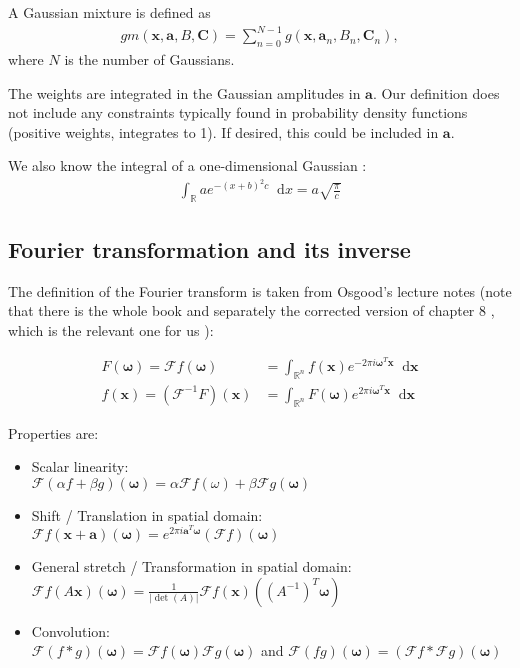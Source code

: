 \documentclass{paper}
\newcommand{\abs}[1]{\left| #1 \right|}
\newcommand{\F}{\ensuremath{\mathcal{F}}}
\newcommand{\vr}[1]{\ensuremath{\boldsymbol{#1}}}
\newcommand{\tr}[1]{\ensuremath{\boldsymbol{#1}}}
\newcommand{\f}[1]{#1}
\newcommand*\diff{\mathop{}\!\mathrm{d}}
\newcommand{\omegavec}[0]{\ensuremath{\vr{\omega{}}}}
\newcommand{\avec}[0]{\ensuremath{\vr{a}}}
\newcommand{\xvec}[0]{\ensuremath{\vr{x}}}
\begin{document}
A Gaussian mixture is defined as
\begin{align}
	\f{gm}(\vr{x}, \vr{a}, B, \tr{C}) = \sum_{n=0}^{N-1} g(\vr{x}, \vr{a}_n, B_{n}, \tr{C}_{n}),
\end{align}
where $N$ is the number of Gaussians.

The weights are integrated in the Gaussian amplitudes in $\vr{a}$.
Our definition does not include any constraints typically found in probability density functions (positive weights, integrates to 1).
If desired, this could be included in $\vr{a}$.

We also know the integral of a one-dimensional Gaussian \citep{wiki_gaussian_int}:
\begin{align}
	\label{eq:gaussian_integral}
	\int_{\mathbb{R}} a e^{-(x+b)^2 c} \diff x = a\sqrt{\frac{\pi}{c}}
\end{align}

\subsection*{Fourier transformation and its inverse}
The definition of the Fourier transform is taken from Osgood's lecture notes (note that there is the whole book \citep{osgood_book} and separately the corrected version of chapter 8 \citep{osgood_chapter8}, which is the relevant one for us ):

\begin{align}
	\f{F} (\vr{\omega}) = \F \f{f} (\vr{\omega}) &= \int_{\mathbb{R}^n} \f{f}(\vr{x}) e^{-2 \pi i \vr{\omega}^T \vr{x}} \diff \vr{x} \\
	\f{f} (\vr{x}) = (\F^{-1} \f{F}) (\vr{x}) &= \int_{\mathbb{R}^n} \f{F}(\vr{\omega}) e^{2 \pi i \vr{\omega}^T \vr{x}} \diff \vr{x}
\end{align}

Properties are:
\begin{itemize}
	\item Scalar linearity: \\
	      $\F(\alpha \f{f} + \beta g)(\omegavec) = \alpha \F \f{f}(\omega) + \beta \F g(\omegavec)$
	\item Shift / Translation in spatial domain: \\
	      $\F\f{f}(\xvec + \avec)(\omegavec) = e^{2 \pi i \avec^T \omegavec} (\F \f{f})(\omegavec)$
	\item General stretch / Transformation in spatial domain:\\
		  $\F\f{f}(A\vr{x})(\omegavec) = \frac{1}{\abs{\det(A)}} \F \f{f}(\xvec)((A^{-1})^T\omegavec)$
	\item Convolution:\\
		  $\F(\f{f}\ast g)(\omegavec) = \F\f{f}(\omegavec) \F g(\omegavec)$ and $\F(\f{f}g)(\omegavec) = (\F\f{f} \ast \F g)(\omegavec)$
\end{itemize}
\end{document}
